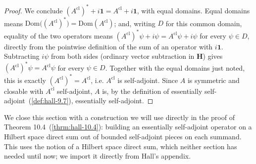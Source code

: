 \begin{proof}
We conclude $(A^{\text{cl}})^* + i\mathbf{1} = A^{\text{cl}} + i\mathbf{1}$, with equal domains. Equal domains means $\text{Dom}\big((A^{\text{cl}})^*\big) = \text{Dom}(A^{\text{cl}})$; and, writing $D$ for this common domain, equality of the two operators means $(A^{\text{cl}})^*\psi + i\psi = A^{\text{cl}}\psi + i\psi$ for every $\psi \in D$, directly from the pointwise definition of the sum of an operator with $i\mathbf{1}$. Subtracting $i\psi$ from both sides (ordinary vector subtraction in $\mathbf{H}$) gives $(A^{\text{cl}})^*\psi = A^{\text{cl}}\psi$ for every $\psi \in D$. Together with the equal domains just noted, this is exactly $(A^{\text{cl}})^* = A^{\text{cl}}$, i.e. $A^{\text{cl}}$ is self-adjoint. Since $A$ is symmetric and closable with $A^{\text{cl}}$ self-adjoint, $A$ is, by the definition of essentially self-adjoint~(\ref{def:hall-9.7}), essentially self-adjoint.
\end{proof}

We close this section with a construction we will use directly in the proof of Theorem 10.4~(\ref{thrm:hall-10.4}): building an essentially self-adjoint operator on a Hilbert space direct sum out of bounded self-adjoint pieces on each summand. This uses the notion of a Hilbert space direct sum, which neither section has needed until now; we import it directly from Hall's appendix.

